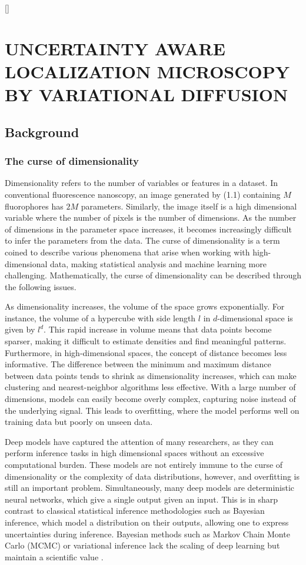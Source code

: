[]

\chapter{UNCERTAINTY AWARE LOCALIZATION MICROSCOPY BY VARIATIONAL DIFFUSION}

\section{Background}

\subsection{The curse of dimensionality}

Dimensionality refers to the number of variables or features in a dataset. In conventional fluorescence nanoscopy, an image generated by (1.1) containing $M$ fluorophores has $2M$ parameters. Similarly, the image itself is a high dimensional variable where the number of pixels is the number of dimensions. As the number of dimensions in the parameter space increases, it becomes increasingly difficult to infer the parameters from the data. The curse of dimensionality is a term coined to describe various phenomena that arise when working with high-dimensional data, making statistical analysis and machine learning more challenging. Mathematically, the curse of dimensionality can be described through the following issues.

As dimensionality increases, the volume of the space grows exponentially. For instance, the volume of a hypercube with side length $l$ in $d$-dimensional space is given by $l^d$. This rapid increase in volume means that data points become sparser, making it difficult to estimate densities and find meaningful patterns. Furthermore, in high-dimensional spaces, the concept of distance becomes less informative. The difference between the minimum and maximum distance between data points tends to shrink as dimensionality increases, which can make clustering and nearest-neighbor algorithms less effective. With a large number of dimensions, models can easily become overly complex, capturing noise instead of the underlying signal. This leads to overfitting, where the model performs well on training data but poorly on unseen data.

Deep models have captured the attention of many researchers, as they can perform inference tasks in high dimensional spaces without an excessive computational burden. These models are not entirely immune to the curse of dimensionality or the complexity of data distributions, however, and overfitting is still an important problem. Simultaneously, many deep models are deterministic neural networks, which give a single output given an input. This is in sharp contrast to classical statistical inference methodologies such as Bayesian inference, which model a distribution on their outputs, allowing one to express uncertainties during inference. Bayesian methods such as Markov Chain Monte Carlo (MCMC) or variational inference lack the scaling of deep learning but maintain a scientific value \parencite{Kingma2013}.

